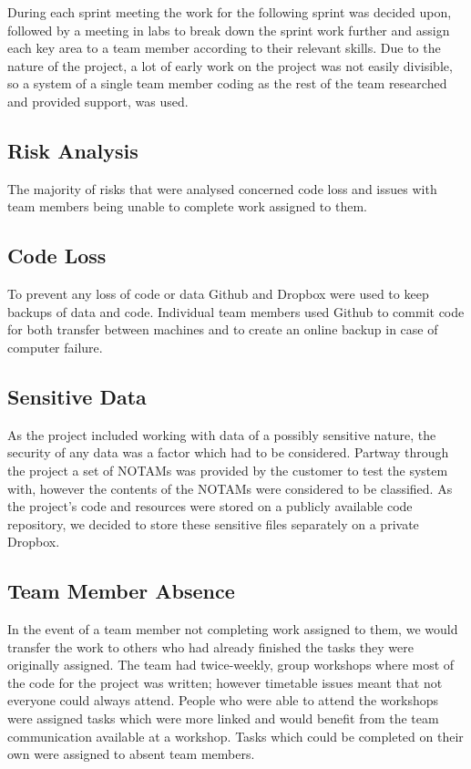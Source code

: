 \documentclass[a4paper, 12pt, twoside]{article}
\begin{document}
During each sprint meeting the work for the following sprint was decided upon, followed by a meeting in labs to break down the sprint work further and assign each key area to a team member according to their relevant skills. Due to the nature of the project, a lot of early work on the project was not easily divisible, so a system of a single team member coding as the rest of the team researched and provided support, was used.

\subsection{Risk Analysis}
\label{sec:plan_risk_analysis}

The majority of risks that were analysed concerned code loss and issues with team members being unable to complete work assigned to them.  

\subsection{Code Loss}

To prevent any loss of code or data Github and Dropbox were used to keep backups of data and code. Individual team members used Github to commit code for both transfer between machines and to create an online backup in case of computer failure.

\subsection{Sensitive Data}

As the project included working with data of a possibly sensitive nature, the security of any data was a factor which had to be considered. Partway through the project a set of NOTAMs was provided by the customer to test the system with, however the contents of the NOTAMs were considered to be classified. As the project's code and resources were stored on a publicly available code repository, we decided to store these sensitive files separately on a private Dropbox.

\subsection{Team Member Absence}

In the event of a team member not completing work assigned to them, we would transfer the work to others who had already finished the tasks they were originally assigned. The team had twice-weekly, group workshops where most of the code for the project was written; however timetable issues meant that not everyone could always attend. People who were able to attend the workshops were assigned tasks which were more linked and would benefit from the team communication available at a workshop. Tasks which could be completed on their own were assigned to absent team members.
\end{document}

